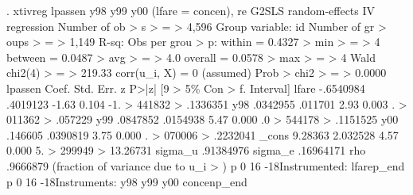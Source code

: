 . xtivreg lpassen y98 y99 y00 (lfare = concen), re
{\smallskip}
G2SLS random-effects IV regression              Number of ob
> s                                                         
>       =                                                   
>              4,596
Group variable: id                              Number of gr
> oups                                                      
>       =                                                   
>              1,149
{\smallskip}
R-sq:                                           Obs per grou
> p:
     within  = 0.4327                                       
>   min                                                     
>       =                                                   
>                  4
     between = 0.0487                                       
>   avg                                                     
>       =                                                   
>                4.0
     overall = 0.0578                                       
>   max                                                     
>       =                                                   
>                  4
{\smallskip}
                                                Wald chi2(4)
>       =                                                   
>             219.33
corr(u_i, X)       = 0 (assumed)                Prob > chi2 
>       =                                                   
>             0.0000
{\smallskip}
     lpassen {\VBAR}      Coef.   Std. Err.      z    P>|z|     [9
> 5\% Con                                                    
>       f. Interval]
       lfare {\VBAR}  -.6540984   .4019123    -1.63   0.104    -1.
> 441832                                                    
>           .1336351
         y98 {\VBAR}   .0342955    .011701     2.93   0.003      .
> 011362                                                    
>            .057229
         y99 {\VBAR}   .0847852   .0154938     5.47   0.000     .0
> 544178                                                    
>           .1151525
         y00 {\VBAR}    .146605   .0390819     3.75   0.000      .
> 070006                                                    
>           .2232041
       _cons {\VBAR}    9.28363   2.032528     4.57   0.000     5.
> 299949                                                    
>           13.26731
     sigma_u {\VBAR}  .91384976
     sigma_e {\VBAR}  .16964171
         rho {\VBAR}   .9666879   (fraction of variance due to u_i
> )
{\lbr}p 0 16 -18{\rbr}Instrumented:   lfare{\lbr}p_end{\rbr}
{\lbr}p 0 16 -18{\rbr}Instruments:    y98 y99 y00 concen{\lbr}p_end{\rbr}
{\smallskip}
